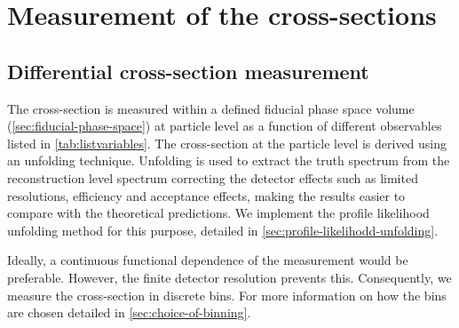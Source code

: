 
\chapter{Measurement of the \tty cross-sections} %
\label{Chapter3} %



\section{Differential cross-section measurement}
\label{sec:diff-xsec-measurement}
The cross-section is measured within a defined fiducial phase space volume (\cref{sec:fiducial-phase-space}) at particle level as a function of different observables listed in \cref{tab:listvariables}. The cross-section at the particle level is derived using an unfolding technique. Unfolding is used to extract the truth spectrum from the reconstruction level spectrum correcting the detector effects such as limited resolutions, efficiency and acceptance effects, making the results easier to compare with the theoretical predictions. We implement the profile likelihood unfolding method for this purpose, detailed in \cref{sec:profile-likelihodd-unfolding}. 

Ideally, a continuous functional dependence of the measurement would be preferable. However, the finite detector resolution prevents this. Consequently, we measure the cross-section in discrete bins. For more information on how the bins are chosen detailed in \cref{sec:choice-of-binning}.

